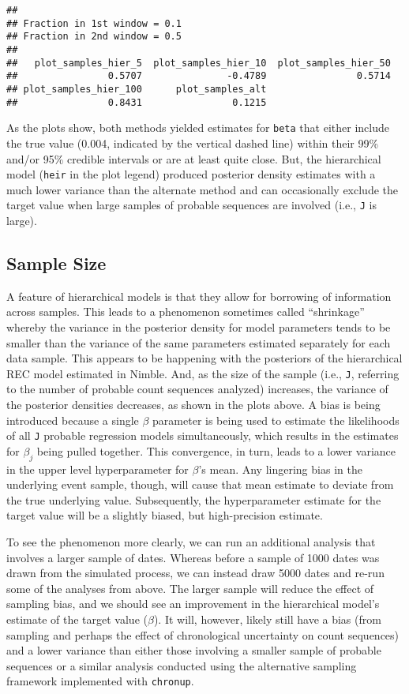 \documentclass[]{article}
\begin{document}
\begin{verbatim}
## 
## Fraction in 1st window = 0.1
## Fraction in 2nd window = 0.5 
## 
##   plot_samples_hier_5  plot_samples_hier_10  plot_samples_hier_50 
##                0.5707               -0.4789                0.5714 
## plot_samples_hier_100      plot_samples_alt 
##                0.8431                0.1215
\end{verbatim}

As the plots show, both methods yielded estimates for \texttt{beta} that
either include the true value (0.004, indicated by the vertical dashed
line) within their 99\% and/or 95\% credible intervals or are at least
quite close. But, the hierarchical model (\texttt{heir} in the plot
legend) produced posterior density estimates with a much lower variance
than the alternate method and can occasionally exclude the target value
when large samples of probable sequences are involved (i.e., \texttt{J}
is large).

\subsection{Sample Size}\label{sample-size}

A feature of hierarchical models is that they allow for borrowing of
information across samples. This leads to a phenomenon sometimes called
``shrinkage'' whereby the variance in the posterior density for model
parameters tends to be smaller than the variance of the same parameters
estimated separately for each data sample. This appears to be happening
with the posteriors of the hierarchical REC model estimated in Nimble.
And, as the size of the sample (i.e., \texttt{J}, referring to the
number of probable count sequences analyzed) increases, the variance of
the posterior densities decreases, as shown in the plots above. A bias
is being introduced because a single \(\beta\) parameter is being used
to estimate the likelihoods of all \texttt{J} probable regression models
simultaneously, which results in the estimates for \(\beta_j\) being
pulled together. This convergence, in turn, leads to a lower variance in
the upper level hyperparameter for \(\beta\)'s mean. Any lingering bias
in the underlying event sample, though, will cause that mean estimate to
deviate from the true underlying value. Subsequently, the hyperparameter
estimate for the target value will be a slightly biased, but
high-precision estimate.

To see the phenomenon more clearly, we can run an additional analysis
that involves a larger sample of dates. Whereas before a sample of 1000
dates was drawn from the simulated process, we can instead draw 5000
dates and re-run some of the analyses from above. The larger sample will
reduce the effect of sampling bias, and we should see an improvement in
the hierarchical model's estimate of the target value (\(\beta\)). It
will, however, likely still have a bias (from sampling and perhaps the
effect of chronological uncertainty on count sequences) and a lower
variance than either those involving a smaller sample of probable
sequences or a similar analysis conducted using the alternative sampling
framework implemented with \texttt{chronup}.
\end{document}
